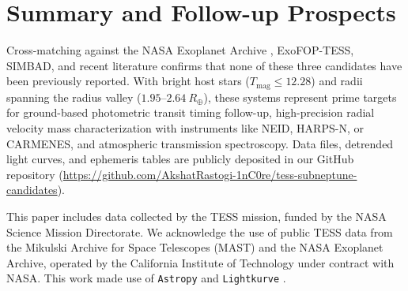﻿\documentclass[modern]{aastex631}
\newcommand{\rearth}{R_\oplus}
\begin{document}
\section{Summary and Follow-up Prospects}
Cross-matching against the NASA Exoplanet Archive \citep{Akeson2013}, ExoFOP-TESS, SIMBAD, and recent literature confirms that none of these three candidates have been previously reported. With bright host stars ($T_{\mathrm{mag}} \le 12.28$) and radii spanning the radius valley ($1.95\text{--}2.64~\rearth$), these systems represent prime targets for ground-based photometric transit timing follow-up, high-precision radial velocity mass characterization with instruments like NEID, HARPS-N, or CARMENES, and atmospheric transmission spectroscopy. Data files, detrended light curves, and ephemeris tables are publicly deposited in our GitHub repository (\url{https://github.com/AkshatRastogi-1nC0re/tess-subneptune-candidates}).

\begin{acknowledgments}
This paper includes data collected by the TESS mission, funded by the NASA Science Mission Directorate. We acknowledge the use of public TESS data from the Mikulski Archive for Space Telescopes (MAST) and the NASA Exoplanet Archive, operated by the California Institute of Technology under contract with NASA. This work made use of \texttt{Astropy} \citep{Astropy2022} and \texttt{Lightkurve} \citep{Lightkurve2018}.
\end{acknowledgments}


{}

\end{document}
